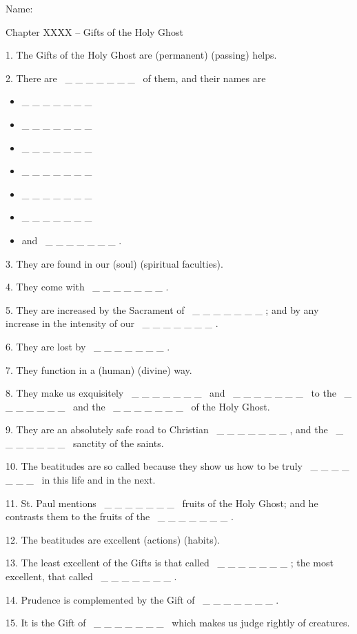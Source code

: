\documentclass[a4paper]{article}
\title{}
\newcounter{z}
\begin{document}
Name:

Chapter XXXX -- Gifts of the Holy Ghost

1. The Gifts of the Holy Ghost are (permanent) (passing) helps.

2. There are \ \_ \_ \_ \_ \_ \_ \_ \ of them, and their names are

\begin{itemize}
\item \_ \_ \_ \_ \_ \_ \_ \ \ 
\item \_ \_ \_ \_ \_ \_ \_ \ \ 
\item \_ \_ \_ \_ \_ \_ \_ \ \ 
\item \_ \_ \_ \_ \_ \_ \_ \ \ 
\item \_ \_ \_ \_ \_ \_ \_ \ \ 
\item \_ \_ \_ \_ \_ \_ \_ \ 
\item and \ \_ \_ \_ \_ \_ \_ \_ .
\end{itemize}
3. They are found in our (soul) (spiritual faculties).

4. They come with \ \_ \_ \_ \_ \_ \_ \_ .

5. They are increased by the Sacrament of \ \_ \_ \_ \_ \_ \_ \_ ; and by any increase in the intensity of our \ \_ \_ \_ \_ \_ \_ \_ .

6. They are lost by \ \_ \_ \_ \_ \_ \_ \_ .

7. They function in a (human) (divine) way.

8. They make us exquisitely \ \_ \_ \_ \_ \_ \_ \_ \ and \ \_ \_ \_ \_ \_ \_ \_ \ to the \ \_ \_ \_ \_ \_ \_ \_ \ and the \ \_ \_ \_ \_ \_ \_ \_ \ of the Holy Ghost.

9. They are an absolutely safe road to Christian \ \_ \_ \_ \_ \_ \_ \_ , and the \ \_ \_ \_ \_ \_ \_ \_ \ sanctity of the saints.

10. The beatitudes are so called because they show us how to be truly \ \_ \_ \_ \_ \_ \_ \_ \ in this life and in the next.

11. St. Paul mentions \ \_ \_ \_ \_ \_ \_ \_ \ fruits of the Holy Ghost; and he contrasts them to the fruits of the \ \_ \_ \_ \_ \_ \_ \_ .

12. The beatitudes are excellent (actions) (habits).

13. The least excellent of the Gifts is that called \ \_ \_ \_ \_ \_ \_ \_ ; the most excellent, that called \ \_ \_ \_ \_ \_ \_ \_ .

14. Prudence is complemented by the Gift of \ \_ \_ \_ \_ \_ \_ \_ .

15. It is the Gift of \ \_ \_ \_ \_ \_ \_ \_ \ which makes us judge rightly of creatures.
\end{document}
